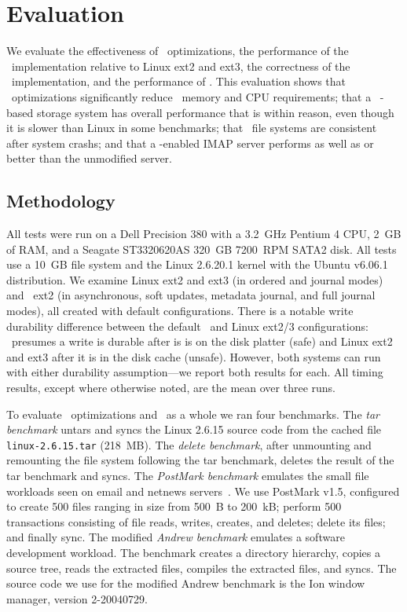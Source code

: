 \section {Evaluation}
\label{sec:evaluation}

We evaluate
%
the effectiveness of \patch\ optimizations,
%
the performance of the \Kudos\ implementation relative to Linux ext2
and ext3,
%
the correctness of the \Kudos\ implementation,
%
and the performance of \patchgroups.
%
This evaluation shows
%
that \patch\ optimizations significantly reduce \patch\ memory and CPU
requirements;
%
that a \Kudos\ \patch-based storage system has overall performance
that is within reason, even though it is slower than Linux in some
benchmarks;
%
that \Kudos\ file systems are consistent after system crashs;
%
and that a \patchgroup-enabled IMAP server performs as well as or
better than the unmodified server.

\subsection{Methodology}

All tests were run on a Dell Precision 380 with a 3.2~GHz Pentium 4
CPU, 2~GB of RAM, and a Seagate ST3320620AS 320~GB 7200~RPM SATA2 disk.
%
All tests use a 10~GB file system and the Linux 2.6.20.1 kernel
with the Ubuntu v6.06.1 distribution.
%
We examine Linux ext2 and ext3 (in ordered and journal modes) and
\Kudos\ ext2 (in asynchronous, soft updates, metadata journal, and
full journal modes), all created with default configurations.
%
There is a notable write durability difference between the default
\Kudos\ and Linux ext2/3 configurations: \Kudos\ presumes a write is
durable after is is on the disk platter (safe) and Linux ext2 and ext3
after it is in the disk cache (unsafe). However, both systems can run
with either durability assumption---we report both results for each.
%
All timing results, except where otherwise noted, are the mean over three runs.

To evaluate \patch\ optimizations and \Kudos\ as a whole we ran four
benchmarks.
%
The \emph{tar benchmark} untars and syncs the Linux 2.6.15 source code
from the cached file \texttt{linux-2.6.15.tar} (218~MB).
%
The \emph{delete benchmark}, after unmounting and remounting the file
system following the tar benchmark, deletes the result of the tar
benchmark and syncs.
%
The \emph{PostMark benchmark} emulates the small file workloads seen
on email and netnews servers~\cite{postmark}. We use PostMark v1.5,
configured to create 500 files ranging in size from 500~B to 200~kB;
perform 500 transactions consisting of file reads, writes, creates,
and deletes; delete its files; and finally sync.
%
The modified \emph{Andrew benchmark} emulates a software development
workload.  The benchmark creates a directory hierarchy, copies a
source tree, reads the extracted files, compiles the extracted files,
and syncs. The source code we use for the modified Andrew benchmark is
the Ion window manager, version 2-20040729.

